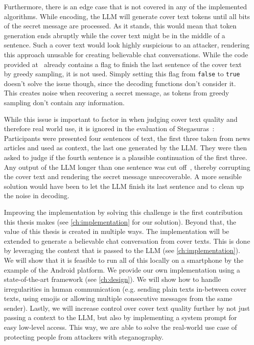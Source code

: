 Furthermore, there is an edge case that is not covered in any of the implemented algorithms. While encoding, the \gls{LLM} will generate cover text tokens until all bits of the secret message are processed. As it stands, this would mean that token generation ends abruptly while the cover text might be in the middle of a sentence. Such a cover text would look highly suspicious to an attacker, rendering this approach unusable for creating believable chat conversations. While the code provided at~\cite{zieglerHarvardnlpNeuralSteganography2025} already contains a flag to finish the last sentence of the cover text by greedy sampling, it is not used. Simply setting this flag from \lstinline|false| to \lstinline|true| doesn't solve the issue though, since the decoding functions don't consider it. This creates noise when recovering a secret message, as tokens from greedy sampling don't contain any information.

While this issue is important to factor in when judging cover text quality and therefore real world use, it is ignored in the evaluation of Stegasuras~\cite{zieglerNeuralLinguisticSteganography2019}: Participants were presented four sentences of text, the first three taken from news articles and used as context, the last one generated by the \gls{LLM}. They were then asked to judge if the fourth sentence is a plausible continuation of the first three. Any output of the \gls{LLM} longer than one sentence was cut off~\cite{zieglerNeuralLinguisticSteganography2019}, thereby corrupting the cover text and rendering the secret message unrecoverable. A more sensible solution would have been to let the \gls{LLM} finish its last sentence and to clean up the noise in decoding.

Improving the implementation by solving this challenge is the first contribution this thesis makes (see \cref{ch:implementation} for our solution). Beyond that, the value of this thesis is created in multiple ways. The implementation will be extended to generate a believable chat conversation from cover texts. This is done by leveraging the context that is passed to the \gls{LLM} (see \cref{ch:implementation}). We will show that it is feasible to run all of this locally on a smartphone by the example of the Android platform. We provide our own implementation using a state-of-the-art framework (see \cref{ch:design}). We will show how to handle irregularities in human communication (e.g. sending plain texts in-between cover texts, using emojis or allowing multiple consecutive messages from the same sender). Lastly, we will increase control over cover text quality further by not just passing a context to the \gls{LLM}, but also by implementing a system prompt for easy low-level access. This way, we are able to solve the real-world use case of protecting people from attackers with steganography.
